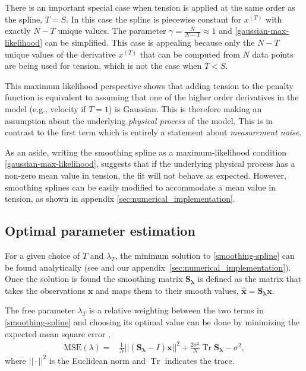 \documentclass{ametsoc}
\DeclareMathOperator{\Tr}{Tr}
\begin{document}
There is an important special case when tension is applied at the same order as the spline, $T=S$. In this case the spline is piecewise constant for $x^{(T)}$ with exactly $N-T$ unique values. The parameter $\gamma =\frac{N}{N-T}\approx 1$ and \eqref{gaussian-max-likelihood} can be simplified. This case is appealing because only the $N-T$ unique values of the derivative $x^{(T)}$ that can be computed from $N$ data points are being used for tension, which is not the case when $T<S$.

This maximum likelihood perspective shows that adding tension to the penalty function is equivalent to assuming that one of the higher order derivatives in the model (e.g., velocity if $T=1$) is Gaussian. This is therefore making an assumption about the underlying \emph{physical process} of the model. This is in contrast to the first term which is entirely a statement about \emph{measurement noise}.

As an aside, writing the smoothing spline as a maximum-likelihood condition \eqref{gaussian-max-likelihood}, suggests that if the underlying physical process has a non-zero mean value in tension, the fit will not behave as expected. However, smoothing splines can be easily modified to accommodate a mean value in tension, as shown in appendix \ref{sec:numerical_implementation}. 

\subsection{Optimal parameter estimation} \label{sec:optimal_parameter}

For a given choice of $T$ and $\lambda_T$, the minimum solution to \eqref{smoothing-spline} can be found analytically (see \citet{teanby2007-mg} and our appendix~\ref{sec:numerical_implementation}). Once the solution is found the smoothing matrix $\mathbf{S_\lambda}$ is defined as the matrix that takes the observations $\mathbf{x}$ and maps them to their smooth values, $\mathbf{\hat{x}} = \mathbf{S_\lambda} \mathbf{x}$.

The free parameter $\lambda_T$ is a relative weighting between the two terms in \eqref{smoothing-spline} and choosing its optimal value can be done by minimizing the expected mean square error \citep{craven1979-nm},
\begin{align}
\label{MSE}
    \textrm{MSE}(\lambda) =& \frac{1}{N} || \left( \mathbf{S_\lambda} - I \right) \mathbf{x} ||^2 + \frac{2 \sigma^2}{N}  \Tr \mathbf{S_\lambda} - \sigma^2,
\end{align}
where $||\cdot||^2$ is the Euclidean norm and $\Tr$ indicates the trace.
\end{document}
